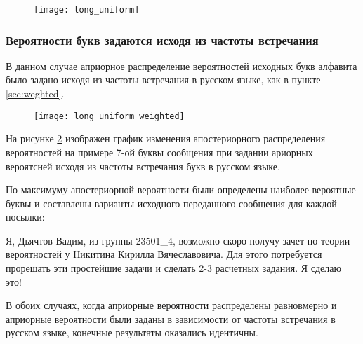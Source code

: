 \begin{figure}[H]
\begin{center}
	\vspace{-0.9cm}
	\texttt{[image: long\_uniform]}
	\caption{}
	\label{plt:long_uniform}
	\vspace{-0.5cm}
\end{center}
\end{figure}

\subsubsection{Вероятности букв задаются исходя из частоты встречания}

В данном случае априорное распределение вероятностей исходных букв алфавита было задано исходя из частоты встречания в русском языке, как в пункте \ref{sec:weghted}.

\begin{figure}[H]
\begin{center}
	\vspace{-0.9cm}
	\texttt{[image: long\_uniform\_weighted]}
	\caption{}
	\label{plt:long_uniform_weighted}
	\vspace{-0.5cm}
\end{center}
\end{figure}

На рисунке \ref{plt:long_uniform_weighted} изображен график изменения апостериорного распределения вероятностей на примере 7-ой буквы сообщения при задании ариорных вероятсней исходя из частоты встречания букв в русском языке.

По максимуму апостериорной вероятности были определены наиболее вероятные буквы и составлены варианты исходного переданного сообщения для каждой посылки:

\vspace{0.5cm}

{ \scriptsize

Я, Дьячтов Вадим, из группы 23501\_4, возможно скоро получу зачет по теории вероятностей у Никитина Кирилла Вячеславовича. Для этого потребуется прорешать эти простейшие задачи и сделать 2-3 расчетных задания. Я сделаю это!

}

\vspace{0.5cm}

В обоих случаях, когда априорные вероятности распределены равновмерно и априорные вероятности были заданы в зависимости от частоты встречания в русском языке, конечные результаты оказались идентичны.

